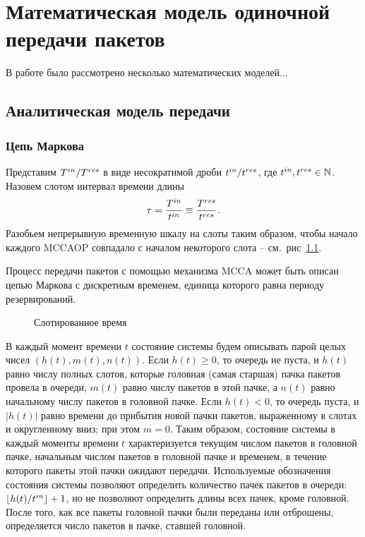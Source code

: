 \chapter{Математическая модель одиночной передачи пакетов}
\label{chapter:model_noBlockAck}

В работе было рассмотрено несколько математических моделей...

\section{Аналитическая модель передачи}
\label{analyticalModel1}
\subsection{Цепь Маркова}

Представим $T^{in}/T^{res}$ в виде несократимой дроби $t^{in}/t^{res}$, где $t^{in}, t^{res}\in\mathbb{N}$. Назовем слотом интервал времени длины $$\tau = \frac{T^{in}}{t^{in}} \equiv \frac{T^{res}}{t^{res}}.$$ Разобьем непрерывную временную шкалу на слоты таким образом, чтобы начало каждого MCCAOP совпадало с началом некоторого слота -- см.~рис~\ref{fig:time}.

Процесс передачи пакетов с помощью механизма MCCA может быть описан цепью Маркова с дискретным временем, единица которого равна периоду резервирований.

\begin{figure}[t]
	\caption{\label{fig:time}Слотированное время}
\end{figure}


В каждый момент времени $t$ состояние системы будем описывать парой целых чисел $(h(t), m(t), n(t))$. Если $h(t) \geqslant 0$, то очередь не пуста, и $h(t)$ равно числу полных слотов, которые головная (самая старшая) пачка пакетов провела в очереди, $m(t)$ равно числу пакетов в этой пачке, а $n(t)$ равно начальному числу пакетов в головной пачке. Если $h(t) < 0$, то очередь пуста, и $|h(t)|$ равно времени до прибытия новой пачки пакетов, выраженному в слотах и округленному вниз; при этом $m=0$. Таким образом, состояние системы в каждый моменты времени $t$ характеризуется текущим числом пакетов в головной пачке, начальным числом пакетов  в головной пачке и временем, в течение которого пакеты этой пачки ожидают передачи. Используемые обозначения состояния системы позволяют определить количество пачек пакетов в очереди:  $\lfloor h(t)/t^{in} \rfloor + 1$, но не позволяют определить длины всех пачек, кроме головной. После того, как все пакеты головной пачки были переданы или отброшены, определяется число пакетов в пачке, ставшей головной.
  
